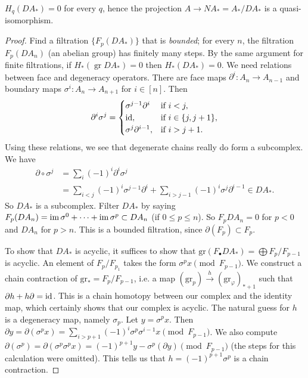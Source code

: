 \begin{theorem}
    $H_q(DA_*)=0$ for every $q$, hence the projection $A \to NA_* =A_*/DA_*$ is a quasi-isomorphism.
\end{theorem}
\begin{proof}
    Find a filtration $\{F_p (DA_*)\} $ that is \emph{bounded}; for every $n$, the filtration $F_p(DA_n )$ (an abelian group) has finitely many steps. By the same argument for finite filtrations, if  $H_* (\operatorname{gr}DA_*)=0$ then $H_*(DA_*)=0$. We need relations between face and degeneracy operators. There are face maps $\partial ^i  \colon A_n  \to A_{n-1}$ and boundary maps $\sigma^i  \colon A_n  \to A_{n+1}$ for $i \in [n]$. Then \[
    \partial ^i \sigma^j =
    \begin{cases}
        \sigma^{j-1} \partial ^i  & \text{if} \ i <j,\\
        \operatorname{id},& \text{if} \ i \in \{j,j+1\} ,\\
        \sigma^j \partial ^{i-1}, & \text{if}\ i>j+1.
    \end{cases}
\] Using these relations, we see that degenerate chains really do form a subcomplex. We have
\begin{align*}
    \partial  \circ \sigma^j &=\sum _i  (-1)^i  \partial ^i \sigma^j \\
                             &=\sum _{i<j}(-1)^i  \sigma^{j-1}\partial ^i + \sum _{i>j-1}(-1)^i \sigma^j \partial ^{i-1}\in DA_*.
\end{align*} So $DA_*$ is a subcomplex. Filter $DA_*$ by saying $F_p(DA_n )=\operatorname{im} \sigma^0+ \cdots + \operatorname{im} \sigma^p \subset DA_n $ (if $0 \leq p \leq n$). So $F_pDA_n =0$ for $p<0$ and $DA_n $ for $p>n$. This is a bounded filtration, since $\partial (F_p) \subset F_p$. 

To show that $DA_*$ is acyclic, it suffices to show that $\mathrm{gr}(F_{\bullet}DA_*)=\bigoplus F_p/F_{p-1}$ is acyclic. An element of $F_p/F_{p_1}$ takes the form $\sigma ^px\pmod{F_{p-1}} $. We construct a chain contraction of $\mathrm{gr}_*=F_p/F_{p-1}$, i.e. a map $(\mathrm{gr}_p) \xrightarrow h(\mathrm{gr}_{\varphi })_{*+1}$ such that $\partial h+h\partial =\operatorname{id}$. This is a chain homotopy between our complex and the identity map, which certainly shows that our complex is acyclic. The natural guess for $h$ is a degeneracy map, namely $\sigma_p$. Let $y=\sigma^p x$. Then $\partial y=\partial (\sigma^px)=\sum _{i> p+1}(-1)^i  \sigma^p \sigma^{i-1}x \pmod{F_{p-1}} $. We also compute $\partial (\sigma^p )=\partial (\sigma^p \sigma^p x) =(-1)^{p+1}y-\sigma^p (\partial y)\pmod{F_{p-1}} $ (the steps for this calculation were omitted). This tells us that $h=(-1)^{p+1}\sigma^p$ is a chain contraction.
\end{proof}

